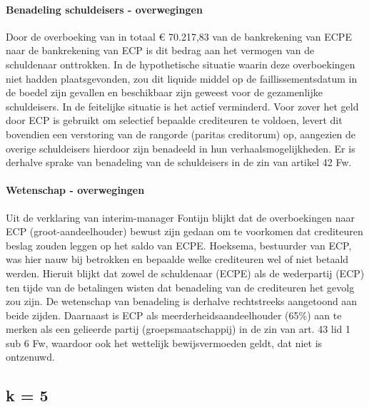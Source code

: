 \documentclass[
  dutch,
  a4paper,
]{article}
\begin{document}
\paragraph{Benadeling schuldeisers - overwegingen}\label{benadeling-schuldeisers---overwegingen-47}

Door de overboeking van in totaal € 70.217,83 van de bankrekening van ECPE naar de bankrekening van ECP is dit bedrag aan het vermogen van de schuldenaar onttrokken. In de hypothetische situatie waarin deze overboekingen niet hadden plaatsgevonden, zou dit liquide middel op de faillissementsdatum in de boedel zijn gevallen en beschikbaar zijn geweest voor de gezamenlijke schuldeisers. In de feitelijke situatie is het actief verminderd. Voor zover het geld door ECP is gebruikt om selectief bepaalde crediteuren te voldoen, levert dit bovendien een verstoring van de rangorde (paritas creditorum) op, aangezien de overige schuldeisers hierdoor zijn benadeeld in hun verhaalsmogelijkheden. Er is derhalve sprake van benadeling van de schuldeisers in de zin van artikel 42 Fw.

\paragraph{Wetenschap - overwegingen}\label{wetenschap---overwegingen-47}

Uit de verklaring van interim-manager Fontijn blijkt dat de overboekingen naar ECP (groot-aandeelhouder) bewust zijn gedaan om te voorkomen dat crediteuren beslag zouden leggen op het saldo van ECPE. Hoeksema, bestuurder van ECP, was hier nauw bij betrokken en bepaalde welke crediteuren wel of niet betaald werden. Hieruit blijkt dat zowel de schuldenaar (ECPE) als de wederpartij (ECP) ten tijde van de betalingen wisten dat benadeling van de crediteuren het gevolg zou zijn. De wetenschap van benadeling is derhalve rechtstreeks aangetoond aan beide zijden. Daarnaast is ECP als meerderheidsaandeelhouder (65\%) aan te merken als een gelieerde partij (groepsmaatschappij) in de zin van art. 43 lid 1 sub 6 Fw, waardoor ook het wettelijk bewijsvermoeden geldt, dat niet is ontzenuwd.

\newpage


\subsection{k = 5}\label{k-5-5}
\end{document}

